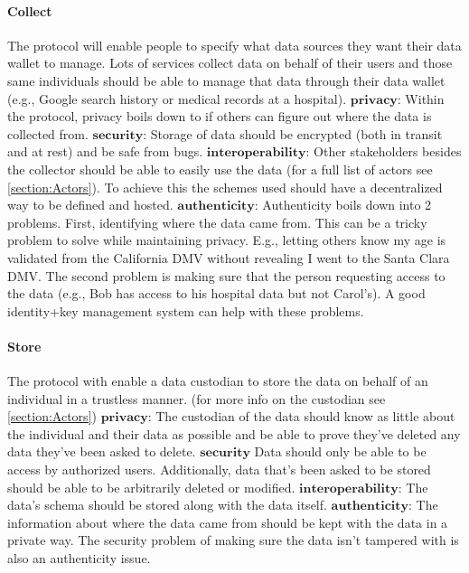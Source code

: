\paragraph{Collect}
The protocol will enable people to specify what data sources they want their data wallet to manage. Lots of services collect data on behalf of their users and those same individuals should be able to manage that data through their data wallet (e.g., Google search history or medical records at a hospital). 
\newline
$\mathbf{privacy}$:
Within the protocol, privacy boils down to if others can figure out where the data is collected from.
\newline
$\mathbf{security}$:
Storage of data should be encrypted (both in transit and at rest) and be safe from bugs.
\newline
$\mathbf{interoperability}$:
Other stakeholders besides the collector should be able to easily use the data (for a full list of actors see \ref{section:Actors}). To achieve this the schemes used should have a decentralized way to be defined and hosted. 
\newline
$\mathbf{authenticity}$:
Authenticity boils down into 2 problems. First, identifying where the data came from. This can be a tricky problem to solve while maintaining privacy. E.g., letting others know my age is validated from the California DMV without revealing I went to the Santa Clara DMV. The second problem is making sure that the person requesting access to the data (e.g., Bob has access to his hospital data but not Carol's). A good identity+key management system can help with these problems.
\paragraph{Store}
The protocol with enable a data custodian to store the data on behalf of an individual in a trustless manner. (for more info on the custodian see \ref{section:Actors})
\newline
$\mathbf{privacy}$:
The custodian of the data should know as little about the individual and their data as possible and be able to prove they've deleted any data they've been asked to delete. 
\newline
$\mathbf{security}$
Data should only be able to be access by authorized users. Additionally, data that's been asked to be stored should be able to be arbitrarily deleted or modified. 
\newline
$\mathbf{interoperability}$:
The data's schema should be stored along with the data itself. 
\newline
$\mathbf{authenticity}$:
The information about where the data came from should be kept with the data in a private way. The security problem of making sure the data isn't tampered with is also an authenticity issue.
